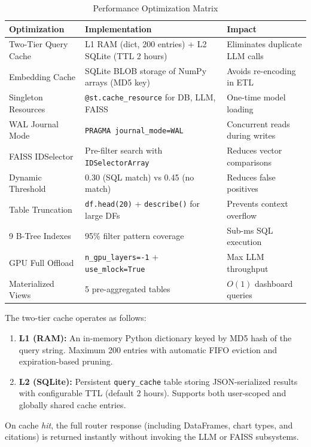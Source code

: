 \documentclass[12pt, a4paper, twoside]{article}
\begin{document}
\begin{table}[H]
\centering
\caption{Performance Optimization Matrix}
\label{tab:perf}
\begin{tabularx}{\textwidth}{L{2.8cm} X L{3.5cm}}
\toprule
{}\color{white}\textbf{Optimization} & \color{white}\textbf{Implementation} & \color{white}\textbf{Impact} \\
\midrule
Two-Tier Query Cache & L1 RAM (dict, 200 entries) + L2 SQLite (TTL 2 hours) & Eliminates duplicate LLM calls \\
Embedding Cache & SQLite BLOB storage of NumPy arrays (MD5 key) & Avoids re-encoding in ETL \\
Singleton Resources & \texttt{@st.cache\_resource} for DB, LLM, FAISS & One-time model loading \\
WAL Journal Mode & \texttt{PRAGMA journal\_mode=WAL} & Concurrent reads during writes \\
FAISS IDSelector & Pre-filter search with \texttt{IDSelectorArray} & Reduces vector comparisons \\
Dynamic Threshold & 0.30 (SQL match) vs 0.45 (no match) & Reduces false positives \\
Table Truncation & \texttt{df.head(20)} + \texttt{describe()} for large DFs & Prevents context overflow \\
9 B-Tree Indexes & 95\% filter pattern coverage & Sub-ms SQL execution \\
GPU Full Offload & \texttt{n\_gpu\_layers=-1} + \texttt{use\_mlock=True} & Max LLM throughput \\
Materialized Views & 5 pre-aggregated tables & $O(1)$ dashboard queries \\
\bottomrule
\end{tabularx}
\end{table}

\begin{infobox}
The two-tier cache operates as follows:

\begin{enumerate}[itemsep=2pt]
  \item \textbf{L1 (RAM):} An in-memory Python dictionary keyed by MD5 hash of the query string. Maximum 200 entries with automatic FIFO eviction and expiration-based pruning.
  \item \textbf{L2 (SQLite):} Persistent \texttt{query\_cache} table storing JSON-serialized results with configurable TTL (default 2 hours). Supports both user-scoped and globally shared cache entries.
\end{enumerate}

On cache \textit{hit}, the full router response (including DataFrames, chart types, and citations) is returned instantly without invoking the LLM or FAISS subsystems.
\end{infobox}
\end{document}
